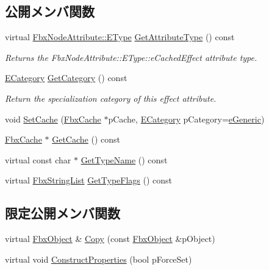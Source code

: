 \subsection*{公開メンバ関数}
\begin{DoxyCompactItemize}
\item 
virtual \hyperlink{class_fbx_node_attribute_a08e1669d3d1a696910756ab17de56d6a}{Fbx\+Node\+Attribute\+::\+E\+Type} \hyperlink{class_fbx_cached_effect_a4c904f4208d8e9f3ddbb49240475b6cc}{Get\+Attribute\+Type} () const
\begin{DoxyCompactList}\small\item\em Returns the Fbx\+Node\+Attribute\+::\+E\+Type\+::e\+Cached\+Effect attribute type. \end{DoxyCompactList}\item 
\hyperlink{class_fbx_cached_effect_ab402402f3e66d6e31eb3002b0bd58c33}{E\+Category} \hyperlink{class_fbx_cached_effect_af5282be789653d1a9c189ddd8540bc5b}{Get\+Category} () const
\begin{DoxyCompactList}\small\item\em Return the specialization category of this effect attribute. \end{DoxyCompactList}\item 
void \hyperlink{class_fbx_cached_effect_a4b31ce36a13bc43e6bfad32c6d9b7f7a}{Set\+Cache} (\hyperlink{class_fbx_cache}{Fbx\+Cache} $\ast$p\+Cache, \hyperlink{class_fbx_cached_effect_ab402402f3e66d6e31eb3002b0bd58c33}{E\+Category} p\+Category=\hyperlink{class_fbx_cached_effect_ab402402f3e66d6e31eb3002b0bd58c33a301e356a3faecf6bea31b2ab220b3cf8}{e\+Generic})
\item 
\hyperlink{class_fbx_cache}{Fbx\+Cache} $\ast$ \hyperlink{class_fbx_cached_effect_aca0e9173f8aa5d446616aa92b9abbea0}{Get\+Cache} () const
\item 
virtual const char $\ast$ \hyperlink{class_fbx_cached_effect_a895c62dc90594a2df7d9392632b626a6}{Get\+Type\+Name} () const
\item 
virtual \hyperlink{class_fbx_string_list}{Fbx\+String\+List} \hyperlink{class_fbx_cached_effect_a0702b43325ac99858e85525b3174e921}{Get\+Type\+Flags} () const
\end{DoxyCompactItemize}
\subsection*{限定公開メンバ関数}
\begin{DoxyCompactItemize}
\item 
virtual \hyperlink{class_fbx_object}{Fbx\+Object} \& \hyperlink{class_fbx_cached_effect_a6e336fc1b97a28cbc5cecfc248efe451}{Copy} (const \hyperlink{class_fbx_object}{Fbx\+Object} \&p\+Object)
\item 
virtual void \hyperlink{class_fbx_cached_effect_a0a33b753735747046809b241eadb19d2}{Construct\+Properties} (bool p\+Force\+Set)
\end{DoxyCompactItemize}
